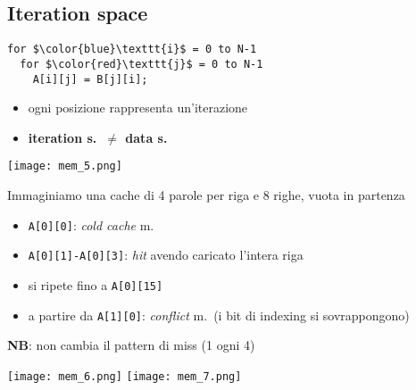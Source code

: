 \subsection{Iteration space}

\noindent\begin{minipage}[c]{.6\textwidth}
\begin{lstlisting}
for $\color{blue}\texttt{i}$ = 0 to N-1
  for $\color{red}\texttt{j}$ = 0 to N-1
    A[i][j] = B[j][i];\end{lstlisting}

\begin{itemize}
  \item ogni posizione rappresenta un'iterazione
  \item \textbf{iteration s.~$\neq$ data s.}
\end{itemize}
\end{minipage}
\hfill
\begin{minipage}[c]{.3\textwidth}
\texttt{[image: mem\_5.png]}
\end{minipage}

\begin{example}[frametitle={Dall'esempio: cache miss per accessi ad \lstinline|A|}]

  \noindent\begin{minipage}[c]{.7\textwidth}
  Immaginiamo una cache di 4 parole per riga e 8 righe, vuota in partenza
  \begin{itemize}
    \item \lstinline|A[0][0]|: \textit{cold cache} m.
    \item \lstinline|A[0][1]-A[0][3]|: \textit{hit} avendo caricato l'intera riga
    \item si ripete fino a \lstinline|A[0][15]|
    \item a partire da \lstinline|A[1][0]|: \textit{conflict} m.~(i bit di indexing si sovrappongono)
  \end{itemize}
  \textbf{NB}: non cambia il pattern di miss (1 ogni 4)
  \end{minipage}
  \begin{minipage}[c]{.3\textwidth}
    \centering
  \texttt{[image: mem\_6.png]}
  \texttt{[image: mem\_7.png]}
  \end{minipage}
\end{example}

